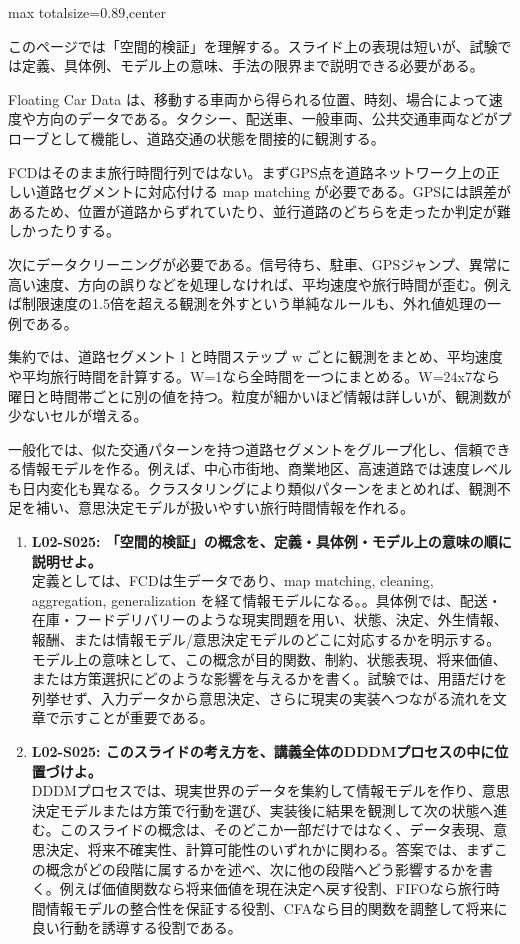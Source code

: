 \begin{minipage}[t]{0.58\textwidth}
\begin{adjustbox}{max totalsize={\textwidth}{0.89\textheight},center}
\begin{minipage}{\textwidth}\scriptsize
{}このページでは「空間的検証」を理解する。スライド上の表現は短いが、試験では定義、具体例、モデル上の意味、手法の限界まで説明できる必要がある。\par
Floating Car Data は、移動する車両から得られる位置、時刻、場合によって速度や方向のデータである。タクシー、配送車、一般車両、公共交通車両などがプローブとして機能し、道路交通の状態を間接的に観測する。\par
FCDはそのまま旅行時間行列ではない。まずGPS点を道路ネットワーク上の正しい道路セグメントに対応付ける map matching が必要である。GPSには誤差があるため、位置が道路からずれていたり、並行道路のどちらを走ったか判定が難しかったりする。\par
次にデータクリーニングが必要である。信号待ち、駐車、GPSジャンプ、異常に高い速度、方向の誤りなどを処理しなければ、平均速度や旅行時間が歪む。例えば制限速度の1.5倍を超える観測を外すという単純なルールも、外れ値処理の一例である。\par
集約では、道路セグメント l と時間ステップ w ごとに観測をまとめ、平均速度や平均旅行時間を計算する。W=1なら全時間を一つにまとめる。W=24x7なら曜日と時間帯ごとに別の値を持つ。粒度が細かいほど情報は詳しいが、観測数が少ないセルが増える。\par
一般化では、似た交通パターンを持つ道路セグメントをグループ化し、信頼できる情報モデルを作る。例えば、中心市街地、商業地区、高速道路では速度レベルも日内変化も異なる。クラスタリングにより類似パターンをまとめれば、観測不足を補い、意思決定モデルが扱いやすい旅行時間情報を作れる。\par{}\begin{enumerate}\item \textbf{L02-S025: 「空間的検証」の概念を、定義・具体例・モデル上の意味の順に説明せよ。}\\定義としては、FCDは生データであり、map matching, cleaning, aggregation, generalization を経て情報モデルになる。。具体例では、配送・在庫・フードデリバリーのような現実問題を用い、状態、決定、外生情報、報酬、または情報モデル/意思決定モデルのどこに対応するかを明示する。モデル上の意味として、この概念が目的関数、制約、状態表現、将来価値、または方策選択にどのような影響を与えるかを書く。試験では、用語だけを列挙せず、入力データから意思決定、さらに現実の実装へつながる流れを文章で示すことが重要である。\item \textbf{L02-S025: このスライドの考え方を、講義全体のDDDMプロセスの中に位置づけよ。}\\DDDMプロセスでは、現実世界のデータを集約して情報モデルを作り、意思決定モデルまたは方策で行動を選び、実装後に結果を観測して次の状態へ進む。このスライドの概念は、そのどこか一部だけではなく、データ表現、意思決定、将来不確実性、計算可能性のいずれかに関わる。答案では、まずこの概念がどの段階に属するかを述べ、次に他の段階へどう影響するかを書く。例えば価値関数なら将来価値を現在決定へ戻す役割、FIFOなら旅行時間情報モデルの整合性を保証する役割、CFAなら目的関数を調整して将来に良い行動を誘導する役割である。\end{enumerate}

\end{minipage}
\end{adjustbox}
\end{minipage}

